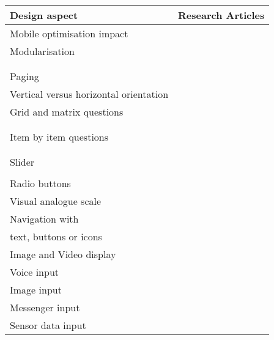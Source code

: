 \begin{table}
	\centering
	\begin{tabular}{ll}
		\toprule
		Design aspect  &  Research Articles \\
		\midrule
		Mobile optimisation impact & \cite{arn_evaluation_2015, revilla_open_2016}\\
		Modularisation & \cite{antoun_design_2018, callegaro_mixed-mode_2013}\\
    	& \cite{toepoel_modularization_2018, bansal_shorter_2017}\\
    	& \cite{mason_effect_2019}\\
    	Paging & \cite{de_bruijne_improving_2014, mavletova_mobile_2014}\\
        Vertical versus horizontal orientation & \cite{de_bruijne_improving_2014}\\
        Grid and matrix questions & \cite{revilla_experiment_2017, revilla_comparing_2018}\\
    	& \cite{mavletova_grid_2018, revilla_testing_2018}\\
    	& \cite{tourangeau_web_2017}\\
        Item by item questions & \cite{revilla_experiment_2017, revilla_comparing_2018}\\
    	& \cite{mavletova_grid_2018, revilla_testing_2018}\\
    	& \cite{tourangeau_web_2017, grady_what_2019}\\
        Slider & \cite{antoun_effects_2017, maineri_slider_2021}\\
    	& \cite{toepoel_sliders_2018}\\
        Radio buttons & \cite{olmsted-hawala_optimal_2018, cernat_radio_2019}\\
        Visual analogue scale & \cite{toepoel_sliders_2018}\\
        Navigation with & \cite{revilla_comparing_2018, olmsted-hawala_optimal_2018}\\
        text, buttons or icons & \cite{lugtig_recruiting_2019, revilla_testing_2018}\\
        Image and Video display & \cite{mendelson_displaying_2017, trubner_effects_2020}\\
    	Voice input & \cite{revilla_improving_2021, revilla_testing_2020}\\
    	Image input &\cite{bosch_answering_2019}\\
    	Messenger input & \cite{toepoel_probing_2021}\\
    	Sensor data input & \cite{hohne_motion_2020, hohne_surveymotion_2019}\\

\end{tabular}
\end{table}
